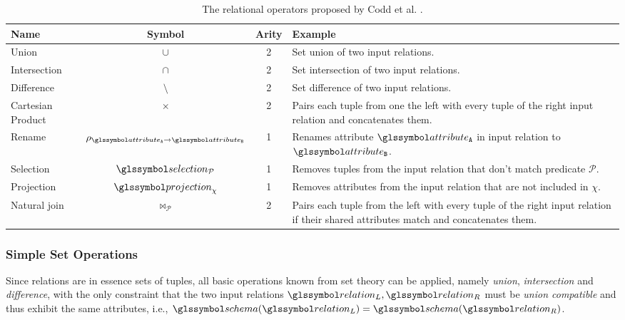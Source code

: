 \begin{table}
    \caption{The relational operators proposed by Codd et al. \cite{Codd:1970Relational,Garcia:2009Database}.}
    \label{table:relational_operators}
    \begin{tabular}{| l | c | c | p{75mm} |}
        \hline
       \textbf{Name} & \textbf{Symbol} & \textbf{Arity}  & \textbf{Example} \\ 
        \hline
        \hline
        Union & $\cup$  & 2 & Set union of two input relations. \\
        \hline
        Intersection & $\cap$  & 2 & Set intersection of two input relations. \\
        \hline
        Difference & $\setminus$  & 2 & Set difference of two input relations. \\
        \hline
        Cartesian Product & $\times$ & 2 & Pairs each tuple from one the left with every tuple of the right input relation and concatenates them. \\
        \hline
        Rename & $\rho_{\attribute_\mathtt{A} \rightarrow \attribute_\mathtt{B}}$ &  1 & Renames attribute $\attribute_\mathtt{A}$ in input relation to $\attribute_\mathtt{B}$. \\
        \hline
        Selection & $\selection_{\mathcal{P}}$ &  1 & Removes tuples from the input relation that don't match predicate $\mathcal{P}$. \\
        \hline
        Projection & $\projection_{\chi}$ &  1 & Removes attributes from the input relation that are not included in $\chi$. \\
        \hline
        Natural join & $\Join_{\mathcal{P}}$ & 2 & Pairs each tuple from the left with every tuple of the right input relation if their shared attributes match and concatenates them. \\
        \hline
    \end{tabular}
\end{table}

\subsubsection{Simple Set Operations}

Since relations are in essence sets of tuples, all basic operations known from set theory can be applied, namely \emph{union}, \emph{intersection} and \emph{difference}, with the only constraint that the two input relations $\relation_L,\relation_R$ must be \emph{union compatible} and thus exhibit the same attributes, i.e., $\schema(\relation_L) = \schema(\relation_R)$.

